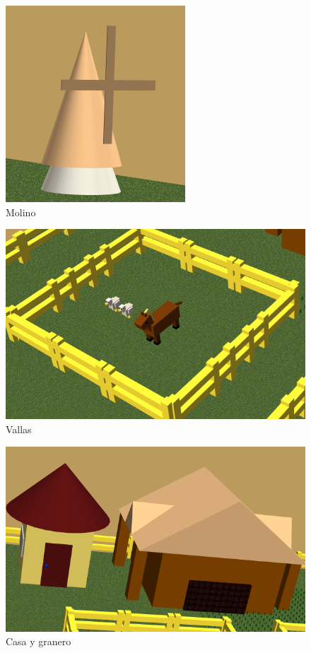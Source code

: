 \documentclass[11pt]{article}
\begin{document}
\begin{figure}[H]
    \centering    
    \includegraphics[scale=0.8]{img/molino.PNG}
    \caption{Molino}
\end{figure}
\begin{figure}[H]
    \centering    
    \includegraphics[scale=0.45]{img/vallas.png}
    \caption{Vallas}
\end{figure}
\begin{figure}[H]
    \centering    
    \includegraphics[scale=0.45]{img/casa-granero.png}
    \caption{Casa y granero}
\end{figure}
\end{document}
